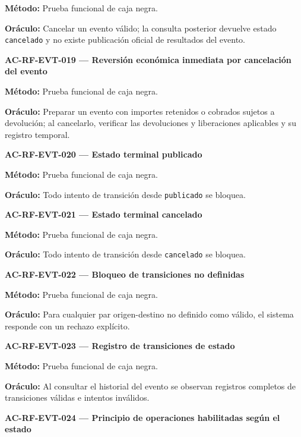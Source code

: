 \documentclass[10pt,letterpaper]{article}
\begin{document}
\textbf{Método:} Prueba funcional de caja negra.\par
\textbf{Oráculo:} Cancelar un evento válido; la consulta posterior devuelve estado \texttt{cancelado} y no existe publicación oficial de resultados del evento.\par\vspace{0.45em}
\noindent\textbf{AC-RF-EVT-019 --- Reversión económica inmediata por cancelación del evento}\par
\textbf{Método:} Prueba funcional de caja negra.\par
\textbf{Oráculo:} Preparar un evento con importes retenidos o cobrados sujetos a devolución; al cancelarlo, verificar las devoluciones y liberaciones aplicables y su registro temporal.\par\vspace{0.45em}
\noindent\textbf{AC-RF-EVT-020 --- Estado terminal publicado}\par
\textbf{Método:} Prueba funcional de caja negra.\par
\textbf{Oráculo:} Todo intento de transición desde \texttt{publicado} se bloquea.\par\vspace{0.45em}
\noindent\textbf{AC-RF-EVT-021 --- Estado terminal cancelado}\par
\textbf{Método:} Prueba funcional de caja negra.\par
\textbf{Oráculo:} Todo intento de transición desde \texttt{cancelado} se bloquea.\par\vspace{0.45em}
\noindent\textbf{AC-RF-EVT-022 --- Bloqueo de transiciones no definidas}\par
\textbf{Método:} Prueba funcional de caja negra.\par
\textbf{Oráculo:} Para cualquier par origen-destino no definido como válido, el sistema responde con un rechazo explícito.\par\vspace{0.45em}
\noindent\textbf{AC-RF-EVT-023 --- Registro de transiciones de estado}\par
\textbf{Método:} Prueba funcional de caja negra.\par
\textbf{Oráculo:} Al consultar el historial del evento se observan registros completos de transiciones válidas e intentos inválidos.\par\vspace{0.45em}
\noindent\textbf{AC-RF-EVT-024 --- Principio de operaciones habilitadas según el estado}\par
\end{document}
